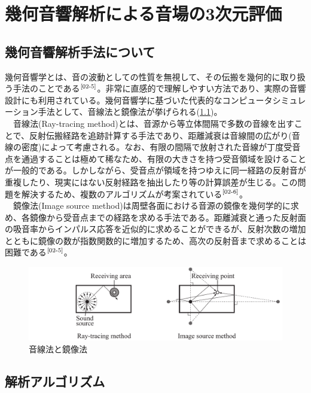 \chapter{幾何音響解析による音場の3次元評価}

\section{幾何音響解析手法について}
幾何音響学とは、音の波動としての性質を無視して、その伝搬を幾何的に取り扱う手法のことである$^{\text{\cite{02-5}}}$。非常に直感的で理解しやすい方法であり、実際の音響設計にも利用されている。幾何音響学に基づいた代表的なコンピュータシミュレーション手法として、音線法と鏡像法が挙げられる(\ref{fig:音線法と鏡像法})。
\\　音線法(Ray-tracing method)とは、音源から等立体間隔で多数の音線を出すことで、反射伝搬経路を追跡計算する手法であり、距離減衰は音線間の広がり(音線の密度)によって考慮される。なお、有限の間隔で放射された音線が丁度受音点を通過することは極めて稀なため、有限の大きさを持つ受音領域を設けることが一般的である。しかしながら、受音点が領域を持つゆえに同一経路の反射音が重複したり、現実にはない反射経路を抽出したり等の計算誤差が生じる。この問題を解決するため、複数のアルゴリズムが考案されている$^{\text{\cite{02-6}}}$。
\\　鏡像法(Image source method)は周壁各面における音源の鏡像を幾何学的に求め、各鏡像から受音点までの経路を求める手法である。距離減衰と通った反射面の吸音率からインパルス応答を近似的に求めることができるが、反射次数の増加とともに鏡像の数が指数関数的に増加するため、高次の反射音まで求めることは困難である$^{\text{\cite{02-5}}}$。


\begin{figure}[htbp]
    \centering
    \includegraphics[keepaspectratio,scale=0.8]{02_att/kikaonkyo.pdf}
    \caption{\hspace{1mm}音線法と鏡像法}
    \label{fig:音線法と鏡像法}
\end{figure}

\section{解析アルゴリズム}

